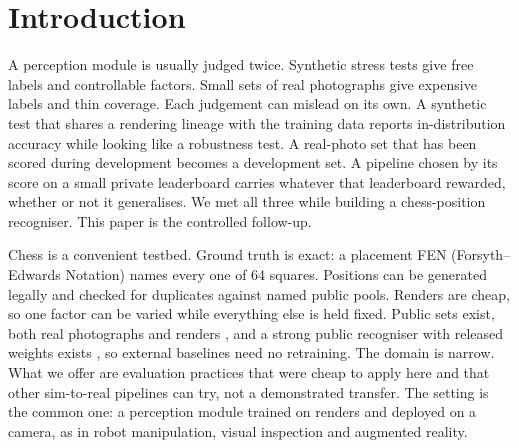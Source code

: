 \section{Introduction}
\label{sec:intro}

A perception module is usually judged twice. Synthetic stress tests give free labels and
controllable factors. Small sets of real photographs give expensive labels and thin coverage. Each
judgement can mislead on its own. A synthetic test that shares a rendering lineage with the
training data reports in-distribution accuracy while looking like a robustness test. A real-photo
set that has been scored during development becomes a development set. A pipeline chosen by its
score on a small private leaderboard carries whatever that leaderboard rewarded, whether or not it
generalises. We met all three while building a chess-position recogniser. This paper is the
controlled follow-up.

Chess is a convenient testbed. Ground truth is exact: a placement FEN (Forsyth--Edwards Notation) names every one of 64
squares. Positions can be generated legally and checked for duplicates against named public pools.
Renders are cheap, so one factor can be varied while everything else is held fixed. Public sets
exist, both real photographs \cite{chessred,slcc,cvchess} and renders \cite{chesscog,cr360}, and a
strong public recogniser with released weights exists \cite{chessqueries}, so external baselines
need no retraining. The domain is narrow. What we offer are evaluation practices that were cheap
to apply here and that other sim-to-real pipelines can try, not a demonstrated transfer. The
setting is the common one: a perception module trained on renders and deployed on a camera, as in
robot manipulation, visual inspection and augmented reality.

